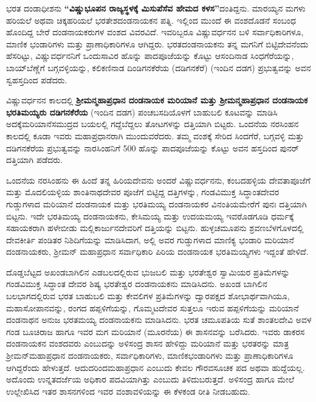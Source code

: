 ಭರತ ದಂಡಾಧೀಶನು \textbf{“ವಿಷ್ಣುಭೂಪನ ರಾಜ್ಯಸ್ಥಳಕ್ಕೆ ಮಿಸುಪೆಸೆವ ಹೇಮದ ಕಳಸ”}ದಂತಿದ್ದನು. ಮಾರಯ್ಯನ ಮಗಳು ಹರಿಯಲೆ ಅಥವಾ ಚಿಕ್ಕಹರಿಯಲೆ ಭರತೇಶದಂಡನಾಯಕನ ಪತ್ನಿ. ಇಲ್ಲಿಂದ ಮುಂದೆ ಈ ವಂಶದೊಡನೆ ಸಂಬಂಧ ಹೊಂದಿದ್ದ ಬೇರೆ ದಂಡನಾಯಕರುಗಳ ವಂಶದ ವಿವರವಿದೆ. ಇವರಿಬ್ಬರೂ ವಿಷ್ಣುವರ್ಧನನ ಬಳಿ ಸರ್ವಾಧಿಕಾರಿಗಳೂ, ಮಾಣಿಕ ಭಂಡಾರಿಗಳು ಮತ್ತು ಪ್ರಾಣಾಧಿಕಾರಿಗಳೂ ಆಗಿದ್ದರು. ಭರತದಂಡನಾಯಕನು ತನ್ನ ಮಗನಿಗೆ ಬಿಟ್ಟಿದೇವನೆಂದು ಹೆಸರಿಟ್ಟು, ವಿಷ್ಣುವರ್ಧನನಿಗೆ ಒಂದುಸಾವಿರ ಹೊನ್ನು ಪಾದಪೂಜೆಯನ್ನು ಕೊಟ್ಟು ಆಸಂದಿನಾಡ ಸಿಂಧಗೆರೆಯನ್ನು, ಬಾಯ್​ಬೆಣ್ಣೆಗೆ ಬಗ್ಗವಳ್ಳಿಯನ್ನು, ಕಲಿಕಣಿನಾಡ ದಿಂಡಿಗನಕೆರೆಯ (ದಡಿಗನಕೆರೆ) (ಇಂದಿನ ದಡಗ) ಪ್ರಭುತ್ವವನ್ನು ಅವನ ಸ್ವಹಸ್ತದಿಂದ ಪಡೆದರು.

ವಿಷ್ಣುವರ್ಧನನ ಕಾಲದಲ್ಲಿ \textbf{ಶ‍್ರೀಮನ್ಮಹಾಪ್ರಧಾನ ದಂಡನಾಯಕ ಮರಿಯಾನೆ ಮತ್ತು ಶ‍್ರೀಮನ್ಮಹಾಪ್ರಧಾನ ದಂಡನಾಯಕ ಭರತಿಮಯ್ಯರು ದಡಿಗನಕೆರೆಯ} (ಇಂದಿನ ದಡಗ) ಪಂಚಬಸದಿಯೊಳಗೆ ಬಾಹುಬಲಿ ಕೂಟವನ್ನು ಮಾಡಿಸಿ ಅದಕ್ಕೆ\break ಮರಿಯಾನೆಸಮುದ್ರದ ಬಯಲಲ್ಲಿ ಗದ್ದೆಬೆದ್ದಲು ತೋಟಗಳನ್ನು ದತ್ತಿಯಾಗಿ ಬಿಟ್ಟರು. ಒಂದನೆಯ ನರಸಿಂಹನ ಕಾಲದಲ್ಲಿ ಕೂಡಾ ಇವರು ಮಹಾಪ್ರಧಾನರಾಗಿ ಮುಂದುವರೆದರು. ತಮ್ಮ ವಂಶಕ್ಕೆ ಸೇರಿದ ಸಿಂದಗೆರೆ, ಬಗ್ಗವಳ್ಳಿ ಮತ್ತು ದಡಿಗನಕೆರೆಯ ಪ್ರಭುತ್ವವನ್ನು ನಾರಸಿಂಹನಿಗೆ 500 ಹೊನ್ನು ಪಾದಪೂಜೆಯನ್ನು ಕೊಟ್ಟು ಅವನ ಹಸ್ತದಿಂದ ಪುನರ್​ದತ್ತಿಯಾಗಿ ಪಡೆದರು.

ಒಂದನೆಯ ನರಸಿಂಹನು ಈ ಹಿಂದೆ ತನ್ನ ಹಿರಿಯದೇವನು ಅಂದರೆ ವಿಷ್ಣುವರ್ಧನನು, ಕಂಬದಹಳ್ಳಿಯ ದೇವತಾ\-ಪೂಜೆಗೆ ಮತ್ತು ಮೊದಲಿಯಳ್ಳಿಯ ಶಾಂತಿನಾಥದೇವರ ಪೂಜೆಗೆ ಬಿಟ್ಟಿದ್ದ ದತ್ತಿಗಳನ್ನು, ಗಂಡವಿಮುಕ್ತ ಸಿದ್ಧಾಂತದೇವರ ಗುಡ್ಡುಗಳಾದ ಮರಿಯಾನೆ ದಂಡನಾಯಕ ಮತ್ತು ಭರತಿಮಯ್ಯ ದಂಡನಾಯಕರ ವಿನಂತಿಯಮೇರೆಗೆ ಪುನಃ ದತ್ತಿಯಾಗಿ ಬಿಟ್ಟನು. ಇದೇ ಭರತಿಮಯ್ಯ ದಂಡನಾಯಕನು, ಕೇಸಿಮಯ್ಯ ಮತ್ತು ಉದಯಮಯ್ಯ ಇವರೊಡಗೂಡಿ ಧರ್ಮಕ್ಕೆ ಸಹಾಯಕರಾಗಿ ಹಳೇಬೀಡು ಮಲ್ಲಿಕಾರ್ಜುನದೇವರಿಗೆ ದತ್ತಿಯನ್ನು ಬಿಟ್ಟನು. ಹುಳ್ಳಚಮೂಪನು ಶ್ರವಣಬೆಳಗೊಳದಲ್ಲಿ ದೇವಕೀರ್ತಿ ಪಂಡಿತರ ನಿಶಿದಿಗೆಯನ್ನು ಮಾಡಿಸಿದಾಗ, ಅಲ್ಲಿ ಅವರ ಗುಡ್ಡುಗಳಾದ ಮಾಣಿಕ್ಯ ಭಂಡಾರಿ ಮರಿಯಾನೆ ದಂಡನಾಯ\-ಕರು, ಶ‍್ರೀಮನ್​ ಮಹಾಪ್ರಧಾನ ಸರ್ವಾಧಿಕಾರಿ ಪಿರಿಯ ದಂಡನಾಯಕ ಭರತಿಮಯ್ಯಗಳು ಇದ್ದಂತೆ ಹೇಳಿದೆ.

ದೊಡ್ಡಬೆಟ್ಟದ ಅಖಂಡಬಾಗಿಲಿನ ಎಡಬಲದಲ್ಲಿರುವ ಭುಜಬಲಿ ಮತ್ತು ಭರತೇಶ್ವರ ಸ್ವಾಮಿಯರ ಪ್ರತಿಮೆಗಳನ್ನು ಗಂಡವಿಮುಕ್ತ ಸಿದ್ಧಾಂತ ದೇವರ ಶಿಷ್ಯ ಭರತೇಶ್ವರ ದಂಡನಾಯಕನು ಮಾಡಿಸಿದನು. ಅಖಂಡ ಬಾಗಿಲಿನ ಬಲಭಾಗದಲ್ಲಿರುವ ಭರತ ಬಾಹುಬಲಿ ಮತ್ತು ಕೇವಲಿಗಳ ಪ್ರತಿಮೆಗಳನ್ನು ದ್ವಾರಪಕ್ಷದ ಶೋಭಾರ್ಥವಾಗಿಯೂ, ಮಹಾಸೋಪಾನವನ್ನು, ರಂಗದ ಹಪ್ಪಳಿಗೆಯನ್ನು, ಗೊಮ್ಮಟದೇವರ ಸುತ್ತಲೂ ಇರುವ ಹಪ್ಪಳಿಗೆಯನ್ನು ಮರಿಯಾನೆ ದಂಡನಾಥನ ಅನುಜ ಭರತಮಯ್ಯ ದಂಡನಾಯಕನು ಮಾಡಿಸಿದನು. ಭರತ ಚಮೂಪತಿಯ ಸುತೆ ಶಾಂತಲದೇವಿ ಅವಳ ಗಂಡ ಬೂಚಿರಾಜ ಹಾಗೂ ಇವರ ಮಗ ಮರಿಯಾನೆ (ಮೂರನೆಯ) ಈ ಶಾಸನವನ್ನು ಬರೆಸಿದರು. ಇವರು ಡಾಕರಸ ದಂಡನಾಯಕನ ವಂಶದವರು ಎಂಬುದನ್ನು ಅಳಿಸಂದ್ರ ಶಾಸನ ಹೇಳಿದ್ದು ಮರಿಯಾನೆ ಮತ್ತು ಭರತರನ್ನು ಮಾತ್ರ ಶ‍್ರೀಮನ್​ ಮಹಾಪ್ರಧಾನ ದಂಡನಾಯಕರು, ಸರ್ವಾಧಿಕಾರಿಗಳು, ಮಾಣಿಕಭಂಡಾರಿಗಳು ಮತ್ತು ಪ್ರಾಣಾಧಿಕಾರಿಗಳೂ ಆಗಿದ್ದರೆಂದು ಹೇಳುತ್ತದೆ. ಆದುದರಿಂದ\break ಮಹಾಪ್ರಧಾನ ಎಂಬುದು ಕೇವಲ ಗೌರವಸೂಚಕ ಪದ ಅಥವಾ ಹುದ್ದೆಯಲ್ಲ. ಅದೊಂದು ಉನ್ನತದರ್ಜೆಯ ಅಧಿಕಾರ ಪದವಿಯಾಗಿತ್ತು ಎಂಬುದು ತಿಳಿದುಬರುತ್ತದೆ. ಅಳಿಸಂದ್ರ ಹಾಗೂ ಮೇಲೆ ಉಲ್ಲೇಖಿಸಿದ ಇತರ ಶಾಸನಗಳಿಂದ ಇವರ ವಂಶಾವಳಿಯನ್ನು ಈ ಕೆಳಕಂಡ ರೀತಿ ನೀಡಬಹುದು.

